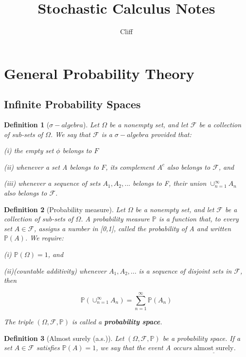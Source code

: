 \documentclass[a4]{article}
\title{Stochastic Calculus Notes}
\author{Cliff}
\newtheorem{definition}{Definition}
\begin{document}
\maketitle
\section{General Probability Theory}
\subsection{Infinite Probability Spaces}
\begin{definition}[$\sigma-algebra$]
Let $\Omega$ be a nonempty set, and let $\mathcal{F}$ be a collection of sub-sets of $\Omega$. We say that $\mathcal{F}$ is a $\sigma-algebra$ provided that:\par 
\quad \par 
(i) the empty set $\phi$ belongs to $F$\par 
(ii) whenever a set A belongs to $F$, its complement $A^{c}$ also belongs to $\mathcal{F}$, and \par 
(iii) whenever a sequence of sets $A_{1},A_{2},...$ belongs to F, their union $\cup^{\infty}_{n = 1}A_{n}$ also belongs to $\mathcal{F}$.\par 

\end{definition}
\bigbreak
\begin{definition}[Probability measure]
Let $\Omega$ be a nonempty set, and let $\mathcal{F}$ be a collection of sub-sets of $\Omega$. A probability measure $\mathbb{P}$ is a function that, to every set $A\in \mathcal{F}$, assigns a number in [0,1], called the probability of A and written $\mathbb{P}(A)$. We require:\par 
\quad \par 
(i) $\mathbb{P}(\Omega) = 1$, and \par 
(ii)\textsl{(countable additivity)} whenever $A_{1},A_{2},...$ is a sequence of disjoint sets in $\mathcal{F}$, then\par 
$$
\mathbb{P}\left(\cup^{\infty}_{n = 1}A_{n}\right) = \sum^{\infty}_{n = 1}\mathbb{P}(A_{n})
$$\par 
\noindent The triple $(\Omega, \mathcal{F}, \mathbb{P})$ is called a \textbf{probability space}.
\end{definition}
\bigbreak
\begin{definition}[Almost surely (a.s.)]
Let $(\Omega, \mathcal{F}, \mathbb{P})$ be a probability space. If a set $A\in \mathcal{F}$ satisfies $\mathbb{P}(A) = 1$, we say that the event A occurs $\underline{\text{almost surely}}$.
\end{definition}
\bigbreak
\end{document}
